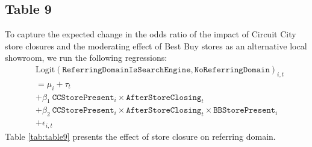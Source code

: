 \documentclass{article}
\begin{document}
\subsection{Table 9}
To capture the expected change in the odds ratio of the impact of Circuit City store closures and
the moderating effect of Best Buy stores as an alternative local showroom, we run the following regressions:
\begin{equation}
	\begin{aligned}
		& \textrm{Logit}\left( \texttt{ReferringDomainIsSearchEngine}, \texttt{NoReferringDomain} \right)_{i,t} \\ &= \mu_{i} + \tau_{t} 
		\\ &+ \beta_1 \ \texttt{CCStorePresent}_i \times \texttt{AfterStoreClosing}_t 
		\\ &+ \beta_2 \ \texttt{CCStorePresent}_i \times \texttt{AfterStoreClosing}_t \times \texttt{BBStorePresent}_i \\ & + \epsilon_{i,t}
	\end{aligned}
\end{equation}
Table \ref{tab:table9} presents the effect of store closure on referring domain.
\begin{table}[!h] \centering 
	\caption{Results of Logistic Regression for Referring Domain} 
	\label{tab:table9} 
\end{table}
\end{document}

